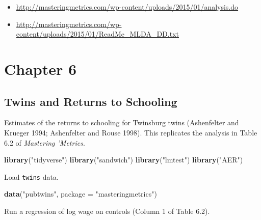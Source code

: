 \documentclass[]{book}
\newenvironment{Shaded}{\begin{snugshade}}{\end{snugshade}}
\newcommand{\KeywordTok}[1]{\textcolor[rgb]{0.13,0.29,0.53}{\textbf{#1}}}
\newcommand{\DataTypeTok}[1]{\textcolor[rgb]{0.13,0.29,0.53}{#1}}
\newcommand{\StringTok}[1]{\textcolor[rgb]{0.31,0.60,0.02}{#1}}
\newcommand{\NormalTok}[1]{#1}
\providecommand{\tightlist}{%
  \setlength{\itemsep}{0pt}\setlength{\parskip}{0pt}}
\theoremstyle{definition}
\theoremstyle{definition}
\theoremstyle{definition}
\theoremstyle{remark}
\begin{document}
\begin{itemize}
\tightlist
\item
  \url{http://masteringmetrics.com/wp-content/uploads/2015/01/analysis.do}
\item
  \url{http://masteringmetrics.com/wp-content/uploads/2015/01/ReadMe_MLDA_DD.txt}
\end{itemize}

\part{Chapter 6}\label{part-chapter-6}

\chapter{Twins and Returns to
Schooling}\label{twins-and-returns-to-schooling}

Estimates of the returns to schooling for Twinsburg twins (Ashenfelter
and Krueger 1994; Ashenfelter and Rouse 1998). This replicates the
analysis in Table 6.2 of \emph{Mastering 'Metrics}.

\begin{Shaded}
\begin{Highlighting}[]
\KeywordTok{library}\NormalTok{(}\StringTok{"tidyverse"}\NormalTok{)}
\KeywordTok{library}\NormalTok{(}\StringTok{"sandwich"}\NormalTok{)}
\KeywordTok{library}\NormalTok{(}\StringTok{"lmtest"}\NormalTok{)}
\KeywordTok{library}\NormalTok{(}\StringTok{"AER"}\NormalTok{)}
\end{Highlighting}
\end{Shaded}

Load \texttt{twins} data.

\begin{Shaded}
\begin{Highlighting}[]
\KeywordTok{data}\NormalTok{(}\StringTok{"pubtwins"}\NormalTok{, }\DataTypeTok{package =} \StringTok{"masteringmetrics"}\NormalTok{)}
\end{Highlighting}
\end{Shaded}

Run a regression of log wage on controls (Column 1 of Table 6.2).
\end{document}
